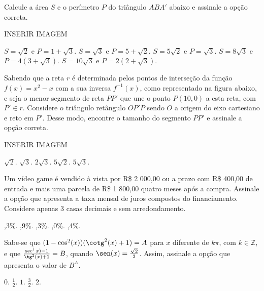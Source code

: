 \begin{question}%
Calcule a área \(S\) e o perímetro \(P\) do triângulo \(ABA'\) abaixo e assinale a opção correta.

INSERIR IMAGEM
    \begin{tasks}
        \task \(S = \sqrt{2}\) e \(P=1+ \sqrt{3}\).
        \task \(S = \sqrt{3}\) e \(P=5 + \sqrt{2}\).
        \task \(S = 5\sqrt{2}\) e \(P=\sqrt{3}\).
        \task \(S = 8\sqrt{3}\) e \(P=4(3+ \sqrt{3})\).
        \task \(S = 10\sqrt{3}\) e \(P=2(2+\sqrt{3})\).
    \end{tasks}
\end{question}

\begin{question}%
Sabendo que a reta \(r\) é determinada pelos pontos de interseção da função \(f(x)= x^2-x\) com a sua inversa \(f^{-1}(x)\), como representado na figura abaixo, e seja o menor segmento de reta \(PP'\) que une o ponto \(P(10,0)\) a esta reta, com \(P'\in r\). Considere o triângulo retângulo \(OP'P\) sendo \(O\) a origem do eixo cartesiano e reto em \(P'\). Desse modo, encontre o tamanho do segmento \(PP'\) e assinale a opção correta.

INSERIR IMAGEM
    \begin{tasks}
        \task \(\sqrt{2}\).
        \task \(\sqrt{3}\).
        \task \(2\sqrt{3}\).
        \task \(5\sqrt{2}\).
        \task \(5\sqrt{3}\).
    \end{tasks}
\end{question}

\begin{question}%
Um vídeo game é vendido à vista por R\$ 2 000,00 ou a prazo com R\$ 400,00 de entrada e mais uma parcela de R\$ 1 800,00 quatro meses após a compra. Assinale a opção que apresenta a taxa mensal de juros compostos do financiamento. Considere apenas 3 casas decimais e sem arredondamento.
    \begin{tasks}
        ,3\%.
        ,9\%.
        ,3\%.
        ,0\%.
        ,4\%.
    \end{tasks}
\end{question}

\begin{question}%
Sabe-se que \((1 - \cos^2(x))(\cotg^2(x) + 1) = A\) para \(x\) diferente de \(k\pi\), com \(k \in \mathbb{Z}\), e que \(\frac{\sec^(x) - 1}{\tg^2(x) + 1} = B\), quando \(\sen(x) = \frac{\sqrt{2}}{2}\). Assim, assinale a opção que apresenta o valor de \(B^A\).
    \begin{tasks}
        \task \(0\).
        \task \(\frac{1}{2}\).
        \task \(1\).
        \task \(\frac{3}{2}\).
        \task \(2\).
    \end{tasks}
\end{question}
